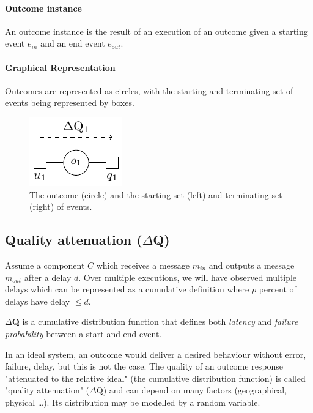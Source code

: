     \paragraph{Outcome instance}
    An outcome instance is the result of an execution of an outcome given a starting event $e_{in}$ and an end event $e_{out}$. \cite{art}

    \paragraph{Graphical Representation}
    Outcomes are represented as circles, with the starting and terminating set of events being represented by boxes.
    \begin{figure}[H]
        \begin{center}
            \includegraphics[scale=1.2]{tikz/outdq.pdf}
        \end{center}
        \caption{The outcome (circle) and the starting set (left) and terminating set (right) of events. \cite{myo}}
    \end{figure}

\subsection{Quality attenuation ($\Delta$Q)}
        Assume a component $C$ which receives a message $m_{in}$ and outputs a message $m_{out}$ after a delay $d$. Over multiple executions, we will have observed multiple delays which can be represented as a cumulative definition where $p$ percent of delays have delay $\le d$. \cite{art} 

        \textbf{$\Delta$Q} is a cumulative distribution function that defines both \textit{latency} and \textit{failure probability} between a start and end event. \cite{dq-tut}

        In an ideal system, an outcome would deliver a desired behaviour without error, failure, delay, but this is not the case. The quality of an outcome response "attenuated to the relative ideal" (the cumulative distribution function) is called "quality attenuation" ($\Delta$Q) and can depend on many factors (geographical, physical \dots). Its distribution may be modelled by a random variable.


